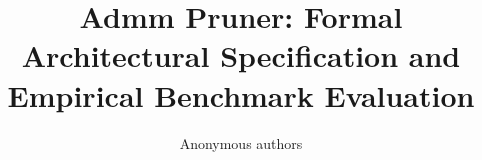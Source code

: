 \title{\textbf{Admm Pruner: Formal Architectural Specification and Empirical Benchmark Evaluation}}

\author{Anonymous authors}
